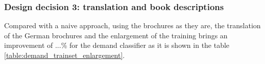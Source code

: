\subsubsection{Design decision 3: translation and book descriptions}

Compared with a naive approach, using the brochures as they are, the translation of the German brochures and the enlargement of the training brings an improvement of ...\% for the demand classifier as it is shown in the table \ref{table:demand_trainset_enlargement}.

\endinput
\begin{itemize}
	\item Introduce our data set (show numbers, show examples)
	\item How we got our training data (everything at least twice, use the demands for learning, use the products for evaluation, Active Learning approach)
	\item Reference Precision/Recall from above again, final
	\item Evaluate of the training data generation, which approach is best (random, grouping)
\end{itemize}


